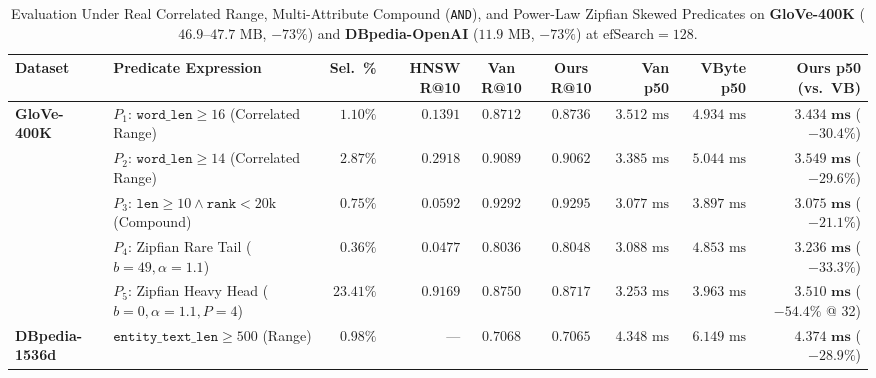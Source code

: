 \begin{table}[t]
\centering
\caption{Evaluation Under Real Correlated Range, Multi-Attribute Compound (\texttt{AND}), and Power-Law Zipfian Skewed Predicates on \textbf{GloVe-400K} ($46.9\text{--}47.7\text{ MB}$, $-73\%$) and \textbf{DBpedia-OpenAI} ($11.9\text{ MB}$, $-73\%$) at $\text{efSearch}=128$.}
\label{tab:real_predicates}
\small
\begin{tabular}{@{}llrrccrrr@{}}
\toprule
\textbf{Dataset} & \textbf{Predicate Expression} & \textbf{Sel.\ \%} & \textbf{HNSW R@10} & \textbf{Van R@10} & \textbf{Ours R@10} & \textbf{Van p50} & \textbf{VByte p50} & \textbf{Ours p50 (vs.\ VB)} \\
\midrule
\multirow{5}{*}{\textbf{GloVe-400K}}
 & $P_1$: $\texttt{word\_len} \ge 16$ (Correlated Range) & $1.10\%$ & $0.1391$ & $0.8712$ & $\mathbf{0.8736}$ & $3.512\text{ ms}$ & $4.934\text{ ms}$ & $\mathbf{3.434\text{ ms}}$ ($-30.4\%$) \\
 & $P_2$: $\texttt{word\_len} \ge 14$ (Correlated Range) & $2.87\%$ & $0.2918$ & $0.9089$ & $\mathbf{0.9062}$ & $3.385\text{ ms}$ & $5.044\text{ ms}$ & $\mathbf{3.549\text{ ms}}$ ($-29.6\%$) \\
 & $P_3$: $\texttt{len}\ge 10 \wedge \texttt{rank}<20\text{k}$ (Compound) & $0.75\%$ & $0.0592$ & $0.9292$ & $\mathbf{0.9295}$ & $3.077\text{ ms}$ & $3.897\text{ ms}$ & $\mathbf{3.075\text{ ms}}$ ($-21.1\%$) \\
 & $P_4$: Zipfian Rare Tail ($b=49, \alpha=1.1$) & $0.36\%$ & $0.0477$ & $0.8036$ & $\mathbf{0.8048}$ & $3.088\text{ ms}$ & $4.853\text{ ms}$ & $\mathbf{3.236\text{ ms}}$ ($-33.3\%$) \\
 & $P_5$: Zipfian Heavy Head ($b=0, \alpha=1.1, P=4$) & $23.41\%$ & $0.9169$ & $0.8750$ & $\mathbf{0.8717}$ & $3.253\text{ ms}$ & $3.963\text{ ms}$ & $\mathbf{3.510\text{ ms}}$ ($-54.4\%$ @ 32) \\
\midrule
\textbf{DBpedia-1536d} & $\texttt{entity\_text\_len} \ge 500$ (Range) & $0.98\%$ & --- & $0.7068$ & $\mathbf{0.7065}$ & $4.348\text{ ms}$ & $6.149\text{ ms}$ & $\mathbf{4.374\text{ ms}}$ ($-28.9\%$) \\
\bottomrule
\end{tabular}
\end{table}


